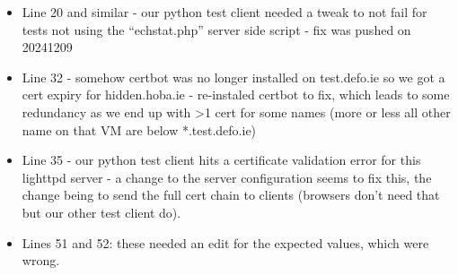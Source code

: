 \begin{itemize}
        test URL:
        \begin{verbatim}
[SSL: SSLV3_ALERT_ILLEGAL_PARAMETER] ssl/tls alert illegal parameter (_ssl.c:1024)
        \end{verbatim}
        being investigated...
    \item Line 20 and similar - our python test client needed a tweak to not fail
        for tests not using the ``echstat.php'' server side script - fix was pushed
        on 20241209
    \item Line 32 - somehow certbot was no longer installed on test.defo.ie so we
        got a cert expiry for hidden.hoba.ie - re-instaled certbot to fix, which
        leads to some redundancy as we end up with >1 cert for some names (more or
        less all other name on that VM are below *.test.defo.ie)
    \item Line 35 - our python test client hits a certificate validation error for
        this lighttpd server - a change to the server configuration seems to fix this, the
        change being to send the full cert chain to clients (browsers don't need
        that but our other test client do).
    \item Lines 51 and 52: these needed an edit for the expected values, which were
        wrong.
\end{itemize}

